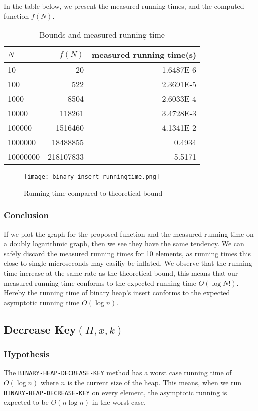 \documentclass[a4paper,oneside,11pt]{article}
\begin{document}
In the table below, we present the measured running times, and the computed function $f(N)$.
\begin{table}
  \begin{center}
    \begin{tabular}{l|r|r}
      $N$ & $f(N)$ & measured running time(s)\\
      \hline
      10       & 20         & \num{1.6487E-6}\\
      100      & 522        & \num{2.3691E-5}\\
      1000     & 8504       & \num{2.6033E-4}\\
      10000    & 118261     & \num{3.4728E-3}\\
      100000   & 1516460    & \num{4.1341E-2}\\
      1000000  & 18488855   & \num{0.4934}\\
      10000000 & 218107833  & \num{5.5171}
    \end{tabular}
    \caption{Bounds and measured running time}
  \end{center}
\end{table}
\begin{figure}
  \texttt{[image: binary\_insert\_runningtime.png]}
  \caption{Running time compared to theoretical bound}
\end{figure}

\subsubsection*{Conclusion}
If we plot the graph for the proposed function and the measured running time on a doubly logarithmic graph, then we see they have the same tendency. We can safely discard the measured running times for 10 elements, as running times this close to single microseconds may easiliy be inflated. We observe that the running time increase at the same rate as the theoretical bound, this means that our measured running time conforms to the expected running time $O(\log N!)$. Hereby the running time of binary heap's insert conforms to the expected asymptotic running time $O(\log n)$.

\subsection*{Decrease Key$(H,x,k)$}
\subsubsection*{Hypothesis}
The \texttt{BINARY-HEAP-DECREASE-KEY} method has a worst case running time of $O(\log n)$ where $n$ is the current size of the heap. This means, when we run \texttt{BINARY-HEAP-DECREASE-KEY} on every element, the asymptotic running is expected to be $O(n\log n)$ in the worst case.
\end{document}
